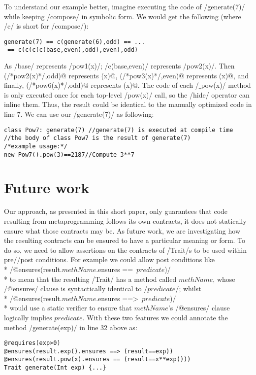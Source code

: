 To understand our example better, imagine executing the code of /generate(7)/ while keeping /compose/ in symbolic form. We would get the following (where /c/ is short for /compose/):
\vspace{-1ex}
\begin{lstlisting}[numbers=none]
generate(7) == c(generate(6),odd) == ...
 == c(c(c(c(base,even),odd),even),odd)
\end{lstlisting}
\vspace{-1ex}
As /base/ represents /pow1(x)/; /c(base,even)/ represents /pow2(x)/. Then \Q@c(/*pow2(x)*/,odd)@ represents (x)@, \Q@c(/*pow3(x)*/,even)@ represents (x)@, and finally,
\Q@c(/*pow6(x)*/,odd)@ represents (x)@.
The code of each /$\_$pow(x)/ method is only executed once for each top-level /pow(x)/ call, so the /hide/ operator can inline them.
Thus, the result could be identical to the manually optimized code in line 7.
We can use our /generate(7)/ as following:
\begin{lstlisting}
class Pow7: generate(7) //generate(7) is executed at compile time
//the body of class Pow7 is the result of generate(7)
/*example usage:*/
new Pow7().pow(3)==2187//Compute 3**7
\end{lstlisting}

\section{Future work}
Our approach, as presented in this short paper, only guarantees that code resulting from metaprogramming follows its own contracts, it does
not statically ensure what those contracts may be. As future work, we are investigating how the resulting contracts can be ensured to have a particular meaning or form.
To do so, we need to allow assertions on the contracts of /Trait/s to be used within pre//post conditions.
For example we could allow post conditions like\\*
/@ensures(result.$\mathit{methName}$.ensures ==\ $\mathit{predicate}$)/ \\*
to mean that the resulting /Trait/ has
a method
called $\mathit{methName}$, whose /@ensures/ clause is syntactically identical to  /$predicate$/; whilst
\\*
/@ensures(result.$\mathit{methName}$.ensures ==>\ $\mathit{predicate}$)/
\\*
would use a static verifier to ensure that $\mathit{methName}$'s /@ensures/ clause logically implies $\mathit{predicate}$.
With these two features we could annotate the method /generate(exp)/ in line 32 above as:
\begin{lstlisting}
@requires(exp>0)
@ensures(result.exp().ensures ==> (result==exp))
@ensures(result.pow(x).ensures == (result==x**exp()))
Trait generate(Int exp) {...}
\end{lstlisting}

